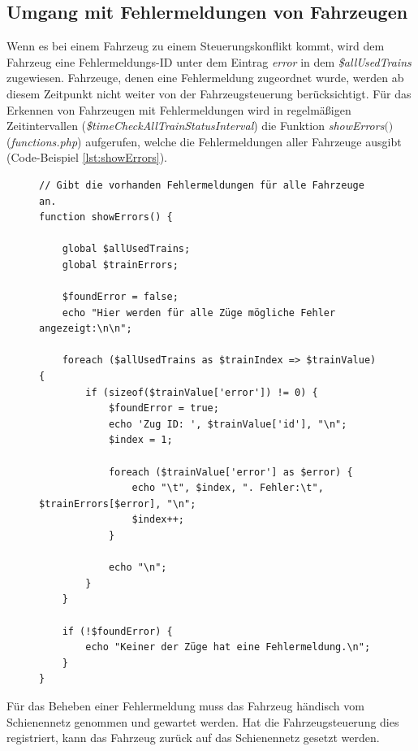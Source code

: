 \subsection{Umgang mit Fehlermeldungen von Fahrzeugen} \label{main_7}
Wenn es bei einem Fahrzeug zu einem Steuerungskonflikt kommt, wird dem Fahrzeug eine Fehlermeldungs-ID unter dem Eintrag \textit{error} in dem \textit{\$allUsedTrains} zugewiesen. Fahrzeuge, denen eine Fehlermeldung zugeordnet wurde, werden ab diesem Zeitpunkt nicht weiter von der Fahrzeugsteuerung berücksichtigt. Für das Erkennen von Fahrzeugen mit Fehlermeldungen wird in regelmäßigen Zeitintervallen (\textit{\$time\-Check\-All\-Train\-Sta\-tus\-Inter\-val}) die Funktion \textit{showErrors$($$)$} (\textit{functions.php}) aufgerufen, welche die Fehlermeldungen aller Fahrzeuge ausgibt (Code-Beispiel \ref{lst:showErrors}).
\begin{figure}
\begin{lstlisting}[caption={\textit{showErrors$($$)$} (\textit{functions.php})},captionpos=b,label={lst:showErrors}]
// Gibt die vorhanden Fehlermeldungen für alle Fahrzeuge an.
function showErrors() {

	global $allUsedTrains;
	global $trainErrors;

	$foundError = false;
	echo "Hier werden für alle Züge mögliche Fehler angezeigt:\n\n";

	foreach ($allUsedTrains as $trainIndex => $trainValue) {
		if (sizeof($trainValue['error']) != 0) {
			$foundError = true;
			echo 'Zug ID: ', $trainValue['id'], "\n";
			$index = 1;

			foreach ($trainValue['error'] as $error) {
				echo "\t", $index, ". Fehler:\t", $trainErrors[$error], "\n";
				$index++;
			}

			echo "\n";
		}
	}

	if (!$foundError) {
		echo "Keiner der Züge hat eine Fehlermeldung.\n";
	}
}
\end{lstlisting}
\end{figure}
Für das Beheben einer Fehlermeldung muss das Fahrzeug händisch vom Schienennetz genommen und gewartet werden. Hat die Fahrzeugsteuerung dies registriert, kann das Fahrzeug zurück auf das Schienennetz gesetzt werden. 


